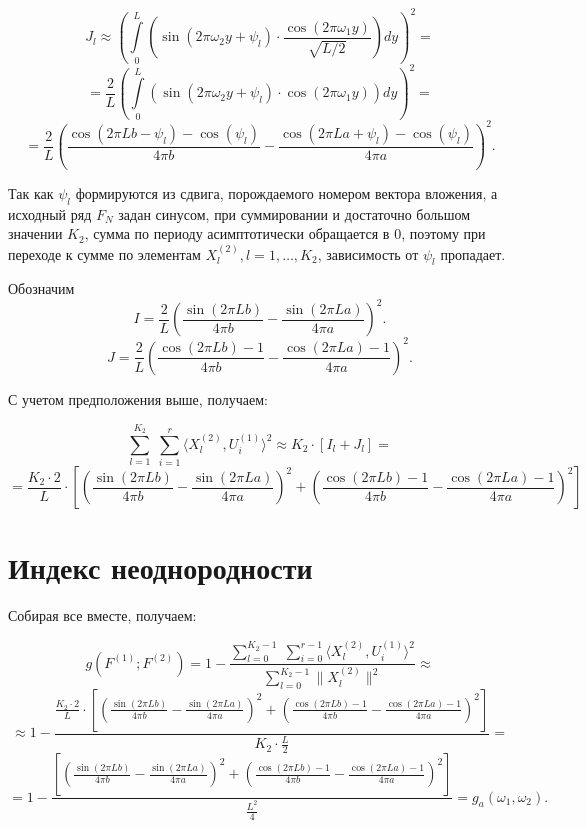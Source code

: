 \documentclass[specialist, substylefile = spbu.rtx,
			   subf, href, 12pt]{disser}
\begin{document}
$$ J_l \approx \left(\int\limits_{0}^{L}(\sin(2\pi\omega_2 y + \psi_l) \cdot \frac{\cos(2\pi\omega_1 y)}{\sqrt{L/2}})dy\right)^2 = $$
$$ = \frac{2}{L}\left(\int\limits_{0}^{L}(\sin(2\pi\omega_2 y + \psi_l) \cdot\cos(2\pi\omega_1 y))dy\right )^2 = $$
$$ = \frac{2}{L} 
\left(  
\frac{\cos(2\pi Lb - \psi_l) - \cos(\psi_l)}{4\pi b} - \frac{\cos(2\pi La + \psi_l) - \cos(\psi_l)}{4\pi a}
\right)^2. $$


Так как $ \psi_l $ формируются из сдвига, порождаемого номером вектора вложения, а исходный ряд $ F_N $ задан синусом, при суммировании и достаточно большом значении $ K_2 $, сумма по периоду асимптотически обращается в $ 0 $, поэтому при переходе к сумме по элементам $ X_l^{(2)}, l=1, \dots, K_2 $, зависимость от $ \psi_l $ пропадает.

Обозначим
$$ I = \frac{2}{L} \left(  \frac{\sin(2\pi Lb)}{4\pi b} - \frac{\sin(2\pi La)}{4\pi a}   \right)^2. $$
$$ J = \frac{2}{L} \left(  \frac{\cos(2\pi Lb) - 1}{4\pi b} - \frac{\cos(2\pi La) - 1}{4\pi a}  \right)^2. $$


С учетом предположения выше, получаем:

$$ \sum\limits_{l=1}^{K_2}\;\sum\limits_{i=1}^{r}\langle X_l^{(2)}, U_i^{(1)}\rangle^2 \approx K_2 \cdot \left [ I_l + J_l \right] = $$
$$ = \frac{K_2 \cdot 2}{L} \cdot \left[ \left(  \frac{\sin(2\pi Lb)}{4\pi b} - \frac{\sin(2\pi La)}{4\pi a}   \right)^2 + \left(  \frac{\cos(2\pi Lb) - 1}{4\pi b} - \frac{\cos(2\pi La) - 1}{4\pi a}  \right)^2 \right] $$


\section{Индекс неоднородности}
Собирая все вместе, получаем:

$$ g(F^{(1)}; F^{(2)}) = 1 - \frac{\sum\limits_{l=0}^{K_2-1}\;\sum\limits_{i=0}^{r-1}\langle X_l^{(2)}, U_i^{(1)}\rangle^2}{\sum\limits_{l=0}^{K_2-1}\|X_l^{(2)}\|^2} \approx $$
$$ \approx 1 - \frac{\frac{K_2 \cdot 2}{L} \cdot \left[ \left(  \frac{\sin(2\pi Lb)}{4\pi b} - \frac{\sin(2\pi La)}{4\pi a}   \right)^2 + \left(  \frac{\cos(2\pi Lb) - 1}{4\pi b} - \frac{\cos(2\pi La) - 1}{4\pi a}  \right)^2 \right]}{K_2\cdot\frac{L}{2}} = $$
\begin{equation}\label{eq:g_a}
	= 1 - \frac{\left[ \left(  \frac{\sin(2\pi Lb)}{4\pi b} - \frac{\sin(2\pi La)}{4\pi a}   \right)^2 + \left(  \frac{\cos(2\pi Lb) - 1}{4\pi b} - \frac{\cos(2\pi La) - 1}{4\pi a}  \right)^2 \right]}{\frac{L^2}{4}} = g_a(\omega_1, \omega_2).
\end{equation}
\end{document}

